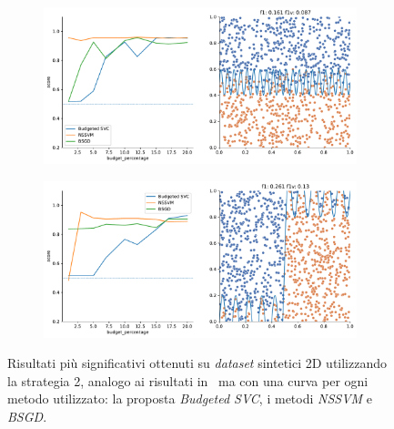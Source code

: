 \begin{figure}
\begin{subfigure}{.5\textwidth}
    \end{subfigure}%
    \hfill
    \begin{subfigure}{.5\textwidth}
        \centering
        \includegraphics[width=\textwidth]{img/comp_new/14.pdf}
    \end{subfigure}
    \begin{subfigure}{.5\textwidth}
        \centering
        \includegraphics[width=\textwidth]{img/comp_new/15.pdf}
    \end{subfigure}
\caption[Risultati su \emph{dataset} sintetici utilizzando strategia 2 in confronto ad altri metodi.]{Risultati più significativi ottenuti su \emph{dataset} sintetici 2D utilizzando la strategia 2, analogo ai risultati in~ ma con una curva per ogni metodo utilizzato: la proposta \emph{Budgeted SVC}, i metodi \emph{NSSVM} e \emph{BSGD}.}
\label{fig:comp_new}
\end{figure}   
